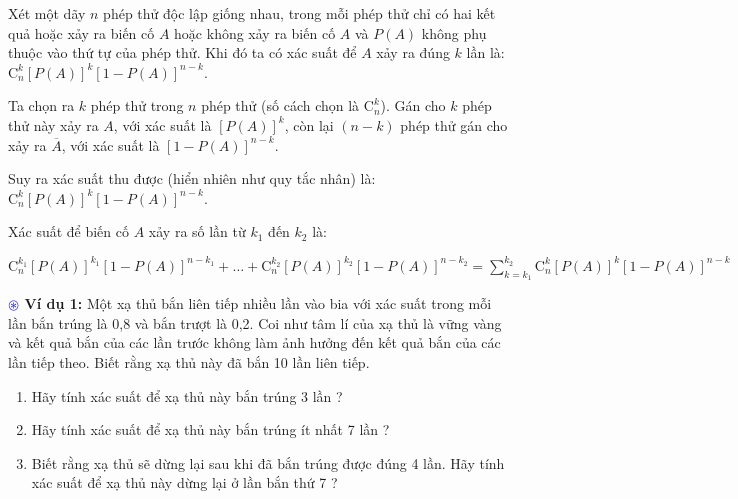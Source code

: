 \documentclass[12pt, a4paper]{article}
\newcommand{\Comb}[2]{\mathrm{C}_{#1}^{#2}}
\begin{document}
		\vspace{0.5cm}
		
		 Xét một dãy \(n\) phép thử độc lập giống nhau, trong mỗi phép thử chỉ có hai kết quả hoặc xảy ra biến cố \(A\) hoặc không xảy ra biến cố \(A\) và \(P(A)\) không phụ thuộc vào thứ tự của phép thử. Khi đó ta có xác suất để \(A\) xảy ra đúng \(k\) lần là: \(\Comb{n}{k} \left[ P(A) \right]^k \left[ 1 - P(A) \right]^{n-k}\).
		
		\vspace{0.3cm}
		
			 Ta chọn ra \(k\) phép thử trong \(n\) phép thử (số cách chọn là \(\Comb{n}{k}\)). Gán cho \(k\) phép thử này xảy ra \(A\), với xác suất là \(\left[ P(A) \right]^k\), còn lại \((n-k)\) phép thử gán cho xảy ra \(\overline{A}\), với xác suất là \(\left[ 1 - P(A) \right]^{n-k}\).
		
		\vspace{0.3cm}
		
		\noindent Suy ra xác suất thu được (hiển nhiên như quy tắc nhân) là: \(\Comb{n}{k} \left[ P(A) \right]^k \left[ 1 - P(A) \right]^{n-k}\).
		
		\vspace{0.3cm}
		
			 Xác suất để biến cố \(A\) xảy ra số lần từ \(k_1\) đến \(k_2\) là:
		
		\vspace{0.3cm}
		
		\noindent \(\Comb{n}{k_1} \left[ P(A) \right]^{k_1} \left[ 1 - P(A) \right]^{n-k_1} + \dots + \Comb{n}{k_2} \left[ P(A) \right]^{k_2} \left[ 1 - P(A) \right]^{n-k_2} = \sum_{k=k_1}^{k_2} \Comb{n}{k} \left[ P(A) \right]^k \left[ 1 - P(A) \right]^{n-k}\)
		
		\vspace{0.5cm}
		
		\begin{tcolorbox}[
			colback=white,
			colframe=black,
			arc=0mm,
			boxrule=0.8pt,
			left=5pt, right=5pt, top=5pt, bottom=5pt
			]
			\textbf{\textcolor{blue}{\(\circledast\)} Ví dụ 1:} Một xạ thủ bắn liên tiếp nhiều lần vào bia với xác suất trong mỗi lần bắn trúng là 0,8 và bắn trượt là 0,2. Coi như tâm lí của xạ thủ là vững vàng và kết quả bắn của các lần trước không làm ảnh hưởng đến kết quả bắn của các lần tiếp theo. Biết rằng xạ thủ này đã bắn 10 lần liên tiếp.
			\begin{enumerate}[label=\textbf{\arabic*.}, leftmargin=*]
				\item Hãy tính xác suất để xạ thủ này bắn trúng 3 lần ?
				\item Hãy tính xác suất để xạ thủ này bắn trúng ít nhất 7 lần ?
				\item Biết rằng xạ thủ sẽ dừng lại sau khi đã bắn trúng được đúng 4 lần. Hãy tính xác suất để xạ thủ này dừng lại ở lần bắn thứ 7 ?
			\end{enumerate}
		\end{tcolorbox}
		
\end{document}
